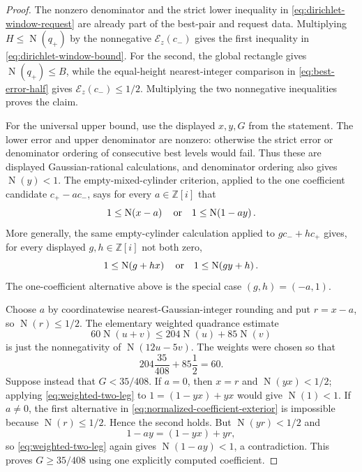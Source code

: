 \documentclass[11pt]{article}
\newcommand{\Zi}{\mathbb{Z}[i]}
\newcommand{\Norm}[1]{\operatorname{N}\!\left(#1\right)}
\begin{document}
\begin{proof}
The nonzero denominator and the strict lower inequality in
\eqref{eq:dirichlet-window-request} are already part of the best-pair and
request data.  Multiplying $H\le\Norm{q_+}$ by the nonnegative
$\mathcal E_z(c_-)$ gives the first inequality in
\eqref{eq:dirichlet-window-bound}.  For the second, the global rectangle gives
$\Norm{q_+}\le B$, while the equal-height nearest-integer comparison in
\eqref{eq:best-error-half} gives $\mathcal E_z(c_-)\le1/2$.
Multiplying the two nonnegative inequalities proves the claim.

For the universal upper bound, use the displayed $x,y,G$ from the statement.
The lower error and upper denominator are nonzero: otherwise the strict error
or denominator ordering of consecutive best levels would fail.  Thus these
are displayed Gaussian-rational calculations, and denominator ordering also
gives $\Norm y<1$.  The empty-mixed-cylinder criterion, applied to the one
coefficient candidate $c_+-ac_-$, says for every $a\in\Zi$ that
\begin{equation}
\label{eq:normalized-coefficient-exterior}
 1\le\Norm{x-a}
 \quad\hbox{or}\quad
 1\le\Norm{1-ay}.
\end{equation}
More generally, the same empty-cylinder calculation applied to
$gc_-+hc_+$ gives, for every displayed $g,h\in\Zi$ not both zero,
\begin{equation}
\label{eq:normalized-linear-combination-exterior}
 1\le\Norm{g+hx}
 \quad\hbox{or}\quad
 1\le\Norm{gy+h}.
\end{equation}
The one-coefficient alternative above is the special case $(g,h)=(-a,1)$.

Choose $a$ by coordinatewise nearest-Gaussian-integer rounding and put
$r=x-a$, so $\Norm r\le1/2$.  The elementary weighted quadrance estimate
\begin{equation}
\label{eq:weighted-two-leg}
 60\Norm{u+v}\le204\Norm u+85\Norm v
\end{equation}
is just the nonnegativity of $\Norm{12u-5v}$.  The weights were chosen so that
\[
             204\frac{35}{408}+85\frac12=60.
\]
Suppose instead that $G<35/408$.  If $a=0$, then $x=r$ and
$\Norm{yx}<1/2$; applying
\eqref{eq:weighted-two-leg} to $1=(1-yx)+yx$ would give $\Norm1<1$.
If $a\ne0$, the first alternative in
\eqref{eq:normalized-coefficient-exterior} is impossible because
$\Norm r\le1/2$.  Hence the second holds.  But $\Norm{yr}<1/2$ and
\[
                  1-ay=(1-yx)+yr,
\]
so \eqref{eq:weighted-two-leg} again gives $\Norm{1-ay}<1$, a contradiction.
This proves $G\ge35/408$ using one explicitly computed coefficient.


\end{proof}
\end{document}
